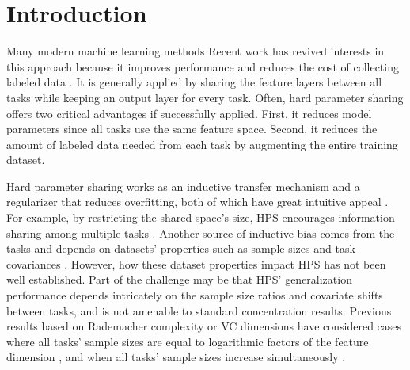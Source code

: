 \section{Introduction}\label{sec_introduction}

Many modern machine learning methods
Recent work has revived interests in this approach because it improves performance and reduces the cost of collecting labeled data \cite{R17}.
It is generally applied by sharing the feature layers between all tasks while keeping an output layer for every task.
Often, hard parameter sharing offers two critical advantages if successfully applied.
First, it reduces model parameters since all tasks use the same feature space.
Second, it reduces the amount of labeled data needed from each task by augmenting the entire training dataset.

Hard parameter sharing works as an inductive transfer mechanism and a regularizer that reduces overfitting, both of which have great intuitive appeal \cite{R17}.
For example, by restricting the shared space's size, HPS encourages information sharing among multiple tasks \cite{KD12}.
Another source of inductive bias comes from the tasks and depends on datasets' properties such as sample sizes and task covariances \cite{WZR20}.
However, how these dataset properties impact HPS has not been well established.
Part of the challenge may be that HPS' generalization performance depends intricately on the sample size ratios and covariate shifts between tasks, and is not amenable to standard concentration results.
Previous results based on Rademacher complexity or VC dimensions have considered cases where all tasks' sample sizes are equal to logarithmic factors of the feature dimension \cite{B00,MPR16}, and when all tasks' sample sizes increase simultaneously \cite{AZ05,M06}.

